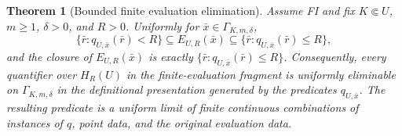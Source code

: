 \documentclass{amsart}
\newtheorem{theorem}{Theorem}[section]
\theoremstyle{definition}
\theoremstyle{remark}
\numberwithin{equation}{section}
\begin{document}
\begin{theorem}[Bounded finite evaluation elimination]
	\label{thm:relative-finite-profile-QE}
	Assume FI and fix $K\Subset U$, $m\ge1$, $\delta>0$, and $R>0$. Uniformly for $\bar x\in\Gamma_{K,m,\delta}$,
	$$\{\bar r:q_{U,\bar x}(\bar r)<R\}\subseteq E_{U,R}(\bar x)\subseteq\{\bar r:q_{U,\bar x}(\bar r)\le R\},$$
	and the closure of $E_{U,R}(\bar x)$ is exactly $\{\bar r:q_{U,\bar x}(\bar r)\le R\}$. Consequently, every quantifier over $H_R(U)$ in the finite-evaluation fragment is uniformly eliminable on $\Gamma_{K,m,\delta}$ in the definitional presentation generated by the predicates $q_{U,\bar x}$. The resulting predicate is a uniform limit of finite continuous combinations of instances of $q$, point data, and the original evaluation data.
\end{theorem}
\end{document}
